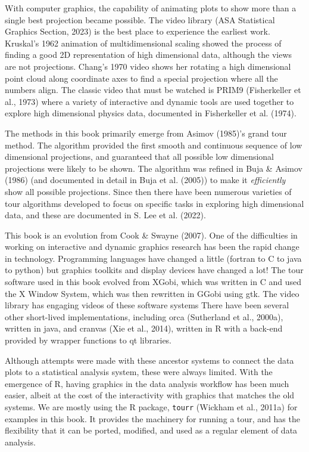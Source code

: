 \documentclass[
  letterpaper,
]{book}
\begin{document}
With computer graphics, the capability of animating plots to show more
than a single best projection became possible. The video library (ASA
Statistical Graphics Section, 2023) is the best place to experience the
earliest work. Kruskal's 1962 animation of multidimensional scaling
showed the process of finding a good 2D representation of high
dimensional data, although the views are not projections. Chang's 1970
video shows her rotating a high dimensional point cloud along coordinate
axes to find a special projection where all the numbers align. The
classic video that must be watched is PRIM9 (Fisherkeller et al., 1973)
where a variety of interactive and dynamic tools are used together to
explore high dimensional physics data, documented in Fisherkeller et al.
(1974).

The methods in this book primarily emerge from Asimov (1985)'s grand
tour method. The algorithm provided the first smooth and continuous
sequence of low dimensional projections, and guaranteed that all
possible low dimensional projections were likely to be shown. The
algorithm was refined in Buja \& Asimov (1986) (and documented in detail
in Buja et al. (2005)) to make it \emph{efficiently} show all possible
projections. Since then there have been numerous varieties of tour
algorithms developed to focus on specific tasks in exploring high
dimensional data, and these are documented in S. Lee et al. (2022).

This book is an evolution from Cook \& Swayne (2007). One of the
difficulties in working on interactive and dynamic graphics research has
been the rapid change in technology. Programming languages have changed
a little (fortran to C to java to python) but graphics toolkits and
display devices have changed a lot! The tour software used in this book
evolved from XGobi, which was written in C and used the X Window System,
which was then rewritten in GGobi using gtk. The video library has
engaging videos of these software systems There have been several other
short-lived implementations, including orca (Sutherland et al., 2000a),
written in java, and cranvas (Xie et al., 2014), written in R with a
back-end provided by wrapper functions to qt libraries.

Although attempts were made with these ancestor systems to connect the
data plots to a statistical analysis system, these were always limited.
With the emergence of R, having graphics in the data analysis workflow
has been much easier, albeit at the cost of the interactivity with
graphics that matches the old systems. We are mostly using the R
package, \texttt{tourr} (Wickham et al., 2011a) for examples in this
book. It provides the machinery for running a tour, and has the
flexibility that it can be ported, modified, and used as a regular
element of data analysis.
\end{document}
